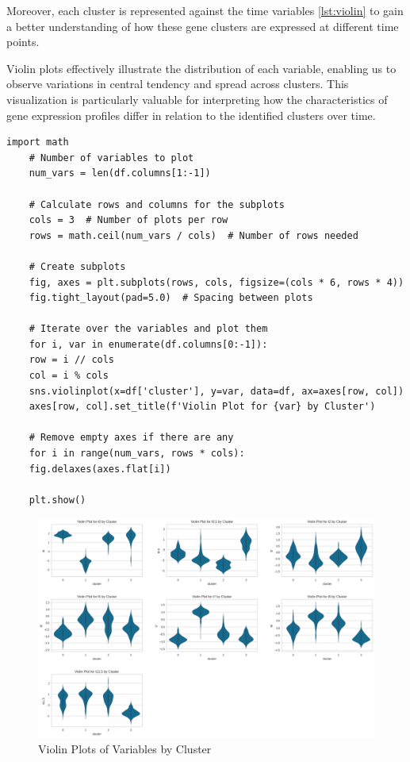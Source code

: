\documentclass{article}
\begin{document}
Moreover, each cluster is represented against the time variables \ref{lst:violin} to gain a better understanding of how these gene clusters are expressed at different time points.

Violin plots effectively illustrate the distribution of each variable, enabling us to observe variations in central tendency and spread across clusters. This visualization is particularly valuable for interpreting how the characteristics of gene expression profiles differ in relation to the identified clusters over time.

\begin{lstlisting}[style=mypython, caption=Violin Plots of Variables by Cluster, label=lst:violin]
	import math
	# Number of variables to plot
	num_vars = len(df.columns[1:-1])
	
	# Calculate rows and columns for the subplots
	cols = 3  # Number of plots per row
	rows = math.ceil(num_vars / cols)  # Number of rows needed
	
	# Create subplots
	fig, axes = plt.subplots(rows, cols, figsize=(cols * 6, rows * 4))
	fig.tight_layout(pad=5.0)  # Spacing between plots
	
	# Iterate over the variables and plot them
	for i, var in enumerate(df.columns[0:-1]):
	row = i // cols
	col = i % cols
	sns.violinplot(x=df['cluster'], y=var, data=df, ax=axes[row, col])
	axes[row, col].set_title(f'Violin Plot for {var} by Cluster')
	
	# Remove empty axes if there are any
	for i in range(num_vars, rows * cols):
	fig.delaxes(axes.flat[i])
	
	plt.show()
\end{lstlisting}

\begin{figure}[H]
	\centering
	\includegraphics[width=\textwidth]{images/violin.png}
	\caption{Violin Plots of Variables by Cluster}
	\label{fig:violin_plots}
\end{figure}
\end{document}
